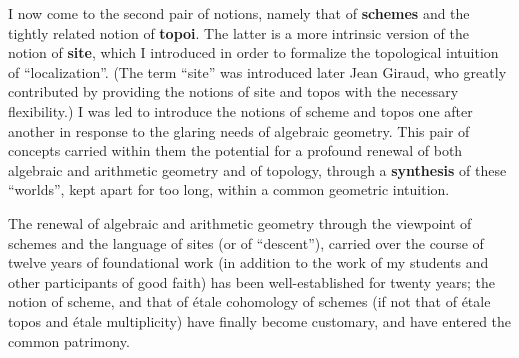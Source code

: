 I now come to the second pair of notions, namely that of 
\textbf{schemes} and the tightly related notion of \textbf{topoi}.
The latter is a more intrinsic version of the notion of \textbf{site}, which I introduced in order
to formalize the topological intuition of ``localization''.
(The term ``site'' was introduced later Jean Giraud, who greatly contributed by
providing the notions of site and topos with the necessary flexibility.) 
I was led to introduce the notions of scheme and topos one after another in response to
the glaring needs of algebraic geometry. 
This pair of concepts carried within them the potential for a profound renewal of both algebraic and
arithmetic geometry and of topology, through a \textbf{synthesis} of these ``worlds'',
kept apart for too long, within a common geometric intuition.

The renewal of algebraic and arithmetic geometry through the viewpoint of schemes and the
language of sites (or of ``descent''), carried over the course of twelve years of
foundational work (in addition to the work of my students and other participants of good
faith) has been well-established for twenty years; 
the notion of scheme, and that of \'etale cohomology of schemes (if not that of \'etale
topos and \'etale multiplicity) have finally become customary, and have entered 
the common patrimony. 

